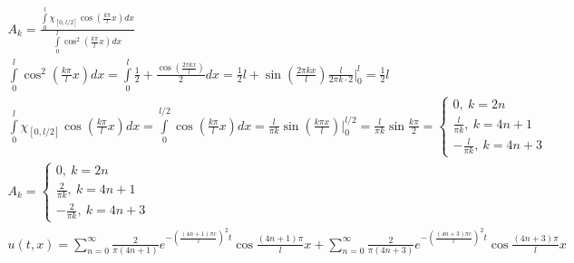 	\begin{gather*}
		A_{k} = \frac{\int\limits_{0}^{l} \chi_{[0,l/2]} \cos\left(\frac{k \pi}{l} x\right) dx}{\int\limits_{0}^{l} \cos^2 \left(\frac{k \pi}{l} x\right) dx}\\
		\int\limits_{0}^{l} \cos^2 \left(\frac{k \pi}{l} x\right) dx
		= \int\limits_{0}^{l} \frac{1}{2} + \frac{\cos\left(\frac{2\pi k x}{l}\right)}{2} dx
		= \frac{1}{2}l + \sin \left(\frac{2\pi k x}{l}\right) \frac{l}{2 \pi k \cdot 2} \Big|_{0}^{l}
		= \frac{1}{2}l\\
		\int\limits_{0}^{l} \chi_{[0,l/2]} \cos\left(\frac{k\pi}{l}x\right) dx
		= \int\limits_{0}^{l/2} \cos\left(\frac{k \pi}{l} x\right) dx
		= \frac{l}{\pi k} \sin\left(\frac{k \pi x}{l}\right)\Big|_{0}^{l/2}
		= \frac{l}{\pi k} \sin \frac{k \pi}{2}
		=
		\begin{cases}
			0,\ k = 2n\\
			\frac{l}{\pi k},\ k = 4n+1\\
			-\frac{l}{\pi k},\ k = 4n+3
		\end{cases}\\
		A_{k} =
		\begin{cases}
			0,\ k = 2n\\
			\frac{2}{\pi k},\ k = 4n+1\\
			-\frac{2}{\pi k},\ k = 4n+3
		\end{cases}\\
		u(t,x) =
		\sum\limits_{n = 0}^{\infty} \frac{2}{\pi (4n+1)} e^{-\left(\frac{(4n+1)\pi c}{l}\right)^2 t} \cos \frac{(4n+1)\pi}{l} x +
		\sum\limits_{n = 0}^{\infty} \frac{2}{\pi (4n+3)} e^{-\left(\frac{(4n+3)\pi c}{l}\right)^2 t} \cos \frac{(4n+3)\pi}{l} x
	\end{gather*}
\vskip 0.4in


